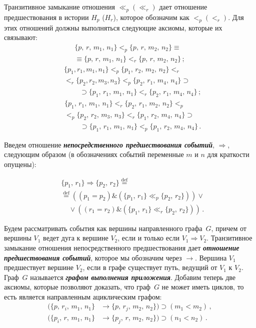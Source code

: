 \begin{multicols}{2}
Транзитивное замыкание отношения $\ll_p (\ll_r)$ дает
отношение предшествования в истории
 $H_p$ ($H_r$), которое обозначим как $<_p (<_r)$.
Для этих отношений должны выполняться следующие аксиомы, которые их
связывают:
\begin{multline*}
\{ p,\,r,\,m_1,\,n_1 \} <_p \{ p,\,r,\,m_2,\,n_2 \} \equiv\\
\equiv \{ p,\,r,\,m_1,\,n_1 \} <_r  \{ p,\,r,\,m_2,\,n_2\}\,;
\end{multline*}
\vspace*{-18pt}
\begin{align*}
&\{p_1, r_1, m_1, n_1\} <_p \{ p_1,\,r_2,\,m_2,\,n_2 \} <_r\\
&<_r \{p_2, r_2, m_3, n_3 \} <_p  \{ p_2,\,r_1,\,m_4,\,n_4\} \supset\\
&\ \ \ \ \ \ \ \ \ \ \supset \{p_1,\,r_1,\,m_1,\,n_1\} <_r \{p_2,\,r_1,\,m_4,\,n_4\}\,;
\end{align*}
\vspace*{-18pt}
\begin{align*}
&\{p_1,\,r_1,\,m_1,\,n_1\} <_r \{p_2,\,r_1,\,m_2,\,n_2\} <_p\\
&<_p \{p_2,\,r_2,\,m_3,\,n_3\} <_r
\{p_1,\,r_2,\,m_4,\,n_4\} \supset\\
&\ \ \ \ \ \ \ \ \ \ \supset\{p_1,\,r_1,\,m_1,\,n_1\} <_p \{p_1,\,r_2,\,m_4,\,n_4\}\,.
\end{align*}

Введем отношение {\bfseries\textit{непосредственного пред\-шес\-т\-во\-ва\-ния 
событий}}, $\Rightarrow$, следующим образом (в обозначениях событий переменные 
$m$ и $n$ для краткости опущены): 

\vspace*{-12pt}
\begin{align*}
& \{p_1,\,r_1\} \Rightarrow \{p_2,\,r_2\} \stackrel{\mathrm{def}}{=}\\
 & \stackrel{\mathrm{def}}{=}
((p_1 = p_2) \& (\{p_1,\,r_1\}
\ll_p\{p_2,\,r_2\}))\lor\\
&\ \ \ \ \ \lor ((r_1 = r_2) \& (\{p_1,\,r_1\}
\ll_r\{p_2,\,r_2\}))\,.
\end{align*}

Будем рассматривать события как вершины направленного графа~$G$,
причем от вершины $V_1$ ведет дуга к вершине $V_2$, если и только если
$V_1\Rightarrow V_2$. Транзитивное замыкание отношения непосредственного
предшествования дает {\bfseries\textit{отношение предшествования событий}}, которое
мы обозначим через $\rightarrow$. Вершина $V_1$ предшествует вершине $V_2$,
если в графе существует путь, ведущий от $V_1$ к $V_2$. Граф~$G$ называется
{\bfseries\textit{графом выполнения приложения}}. Добавим теперь две аксиомы, которые
позволяют доказать, что граф~$G$ не может иметь циклов, то есть является
на\-прав\-лен\-ным ациклическим графом:
\begin{align*}
(\{p,\,r_i,\,m_1,\,n_1\} &\rightarrow \{p,\,r_j,\,m_2,\,n_2\}) \supset (m_1 <  m_2)\,,\\
(\{p_i,\,r,\,m_1,\,n_1\}&\rightarrow \{p_j,\,r,\,m_2,\,n_2\}) \supset (n_1 <  n_2)\,.
\end{align*}


\end{multicols}
